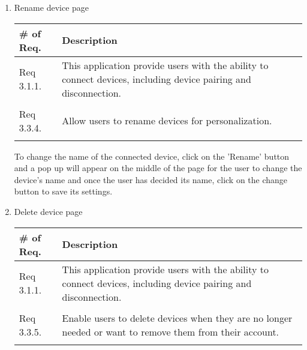 \begin{enumerate}[label=\arabic*.]
\begin{enumerate}[label*={\arabic*.},ref=\theenumi.\arabic*]
            \newpage
              \item Rename device page
              \begin{table}[H]
                        \center
                        \begin{tabular}{m{1.4cm} m{5.5cm}}
                            \toprule
                            \# of Req. & Description                                                                                                                   \\
                            \midrule
                            Req 3.1.1.   & This application provide users with the ability to connect devices, including device pairing and disconnection. \\\\
                            Req 3.3.4.   & Allow users to rename devices for personalization. \\\\
                            \bottomrule
                        \end{tabular}
                    \end{table}
                
              To change the name of the connected device, click on the 'Rename' button and a pop up will appear on the middle of the page for the user to change the device's name and once the user has decided its name, click on the change button to save its settings. \\
              \newpage
              \item Delete device page
              \begin{table}[H]
                        \center
                        \begin{tabular}{m{1.4cm} m{5.5cm}}
                            \toprule
                            \# of Req. & Description                                                                                                                   \\
                            \midrule
                            Req 3.1.1.   & This application provide users with the ability to connect devices, including device pairing and disconnection. \\\\
                            Req 3.3.5.   & Enable users to delete devices when they are no longer needed or want to remove them from their account. \\\\
                            \bottomrule
                        \end{tabular}
                    \end{table}
                

\end{enumerate}
\end{enumerate}
